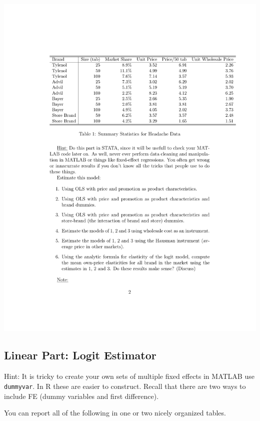 \documentclass[11pt,letterpaper]{article}
\begin{document}
\includegraphics{./resources/table1.pdf}
\subsection*{Linear Part: Logit Estimator}
Hint: It is tricky to create your own sets of multiple fixed effects in MATLAB  use \texttt{dummyvar}. In R these are easier to construct. Recall that there are two ways to include FE (dummy variables and first difference).

You can report all of the following in one or two nicely organized tables.\\
\end{document}
